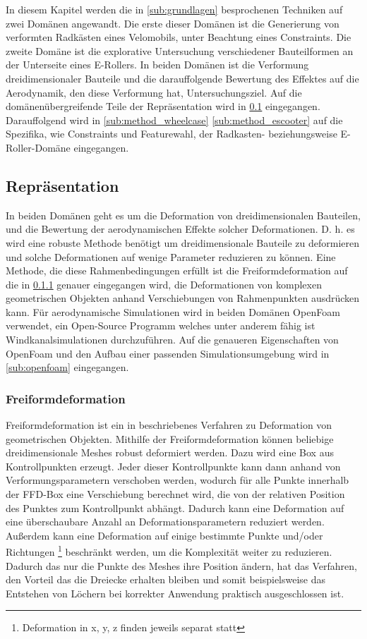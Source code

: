 In diesem Kapitel werden die in \ref{sub:grundlagen} besprochenen Techniken auf zwei Domänen angewandt.
Die erste dieser Domänen ist die Generierung von verformten Radkästen eines Velomobils, unter Beachtung eines Constraints.
Die zweite Domäne ist die explorative Untersuchung verschiedener Bauteilformen an der Unterseite eines E-Rollers.
In beiden Domänen ist die Verformung dreidimensionaler Bauteile und die darauffolgende Bewertung des Effektes auf die Aerodynamik, den diese Verformung hat, Untersuchungsziel.
Auf die domänenübergreifende Teile der Repräsentation wird in \ref{sub:representation} eingegangen.
Darauffolgend wird in \ref{sub:method_wheelcase} \ref{sub:method_escooter} auf die Spezifika, wie Constraints und Featurewahl, der Radkasten- beziehungsweise E-Roller-Domäne eingegangen.

\subsection{Repräsentation}
\label{sub:representation}

In beiden Domänen geht es um die Deformation von dreidimensionalen Bauteilen, und die Bewertung der aerodynamischen Effekte solcher Deformationen.
D. h. es wird eine robuste Methode benötigt um dreidimensionale Bauteile zu deformieren und solche Deformationen auf wenige Parameter reduzieren zu können.
Eine Methode, die diese Rahmenbedingungen erfüllt ist die Freiformdeformation \cite{Sederberg.1986} auf die in \ref{sub:ffd} genauer eingegangen wird, die Deformationen von komplexen geometrischen Objekten anhand Verschiebungen von Rahmenpunkten ausdrücken kann.
Für aerodynamische Simulationen wird in beiden Domänen OpenFoam verwendet, ein Open-Source Programm welches unter anderem fähig ist Windkanalsimulationen durchzuführen.
Auf die genaueren Eigenschaften von OpenFoam und den Aufbau einer passenden Simulationsumgebung wird in \ref{sub:openfoam} eingegangen.

\subsubsection{Freiformdeformation}
\label{sub:ffd}
Freiformdeformation ist ein in \cite{Sederberg.1986} beschriebenes Verfahren zu Deformation von geometrischen Objekten.
Mithilfe der Freiformdeformation können beliebige dreidimensionale Meshes robust deformiert werden.
Dazu wird eine Box aus Kontrollpunkten erzeugt.
Jeder dieser Kontrollpunkte kann dann anhand von Verformungsparametern verschoben werden, wodurch für alle Punkte innerhalb der FFD-Box eine Verschiebung berechnet wird, die von der relativen Position des Punktes zum Kontrollpunkt abhängt.
Dadurch kann eine Deformation auf eine überschaubare Anzahl an Deformationsparametern reduziert werden.
Außerdem kann eine Deformation auf einige bestimmte Punkte und/oder Richtungen
\footnote{Deformation in x, y, z finden jeweils separat statt}
beschränkt werden, um die Komplexität weiter zu reduzieren.
Dadurch das nur die Punkte des Meshes ihre Position ändern, hat das Verfahren, den Vorteil das die Dreiecke erhalten bleiben und somit beispielsweise das Entstehen von Löchern bei korrekter Anwendung praktisch ausgeschlossen ist.

